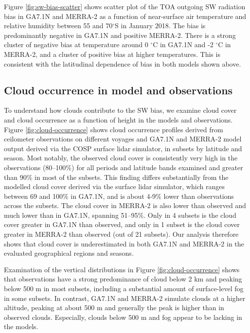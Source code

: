 Figure \ref{fig:sw-bias-scatter} shows scatter plot of the TOA outgoing SW
radiation bias in GA7.1N and MERRA-2 as a function of near-surface air
temperature and relative humidity between 55 and 70$^\circ$S in January
2018. The bias is predominantly negative in GA7.1N and positive MERRA-2. There
is a strong cluster of negative bias at temperature around 0 $^\circ$C in
GA7.1N and -2 $^\circ$C in MERRA-2, and a cluster of positive bias at higher
temperatures. This is consistent with the latitudinal dependence of bias in
both models shown above.

\subsection{Cloud occurrence in model and observations}
\label{sec:cloud-occurrence}

To understand how clouds contribute to the SW bias, we examine cloud cover and
cloud occurrence as a function of height in the models and observations. Figure
\ref{fig:cloud-occurrence} shows cloud occurrence profiles derived from
ceilometer observations on different voyages and GA7.1N and MERRA-2 model
output derived via the COSP surface lidar simulator, in subsets by latitude and
season. Most notably, the observed cloud cover is consistently very high in the
observations (80--100\%) for all periods and latitude bands examined and
greater than 90\% in most of the subsets. This finding differs substantially
from the modelled cloud cover derived via the surface lidar simulator, which
ranges between 69 and 100\% in GA7.1N, and is about 4-9\% lower than
observations across the subsets. The cloud cover in MERRA-2 is also lower than
observed and much lower than in GA7.1N, spanning 51--95\%. Only in 4 subsets is
the cloud cover greater in GA7.1N than observed, and only in 1 subset is the
cloud cover greater in MERRA-2 than observed (out of 21 subsets).  Our analysis
therefore shows that cloud cover is underestimated in both GA7.1N and MERRA-2
in the evaluated geographical regions and seasons.

Examination of the vertical distributions in Figure \ref{fig:cloud-occurrence}
shows that observations have a strong predominance of cloud below 2 \unit{km}
and peaking below 500 m in most subsets, including a substantial amount
of surface-level fog in some subsets. In contrast, GA7.1N and MERRA-2 simulate
clouds at a higher altitude, peaking at about 500 \unit{m} and generally the
peak is higher than in observed clouds. Especially, clouds below 500 m and fog
appear to be lacking in the models.


